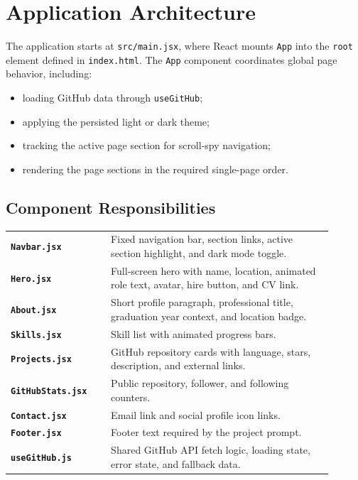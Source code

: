 \documentclass[12pt,a4paper]{article}
\newcommand{\code}[1]{\colorbox{CodeBg}{\texttt{#1}}}
\begin{document}
\section{Application Architecture}

The application starts at \code{src/main.jsx}, where React mounts \code{App}
into the \code{root} element defined in \code{index.html}. The \code{App}
component coordinates global page behavior, including:

\begin{itemize}
  \item loading GitHub data through \code{useGitHub};
  \item applying the persisted light or dark theme;
  \item tracking the active page section for scroll-spy navigation;
  \item rendering the page sections in the required single-page order.
\end{itemize}

\subsection{Component Responsibilities}

\begin{longtable}{>{\bfseries}p{0.28\linewidth}p{0.62\linewidth}}
\code{Navbar.jsx} & Fixed navigation bar, section links, active section highlight, and dark mode toggle. \\
\code{Hero.jsx} & Full-screen hero with name, location, animated role text, avatar, hire button, and CV link. \\
\code{About.jsx} & Short profile paragraph, professional title, graduation year context, and location badge. \\
\code{Skills.jsx} & Skill list with animated progress bars. \\
\code{Projects.jsx} & GitHub repository cards with language, stars, description, and external links. \\
\code{GitHubStats.jsx} & Public repository, follower, and following counters. \\
\code{Contact.jsx} & Email link and social profile icon links. \\
\code{Footer.jsx} & Footer text required by the project prompt. \\
\code{useGitHub.js} & Shared GitHub API fetch logic, loading state, error state, and fallback data. \\
\end{longtable}
\end{document}

